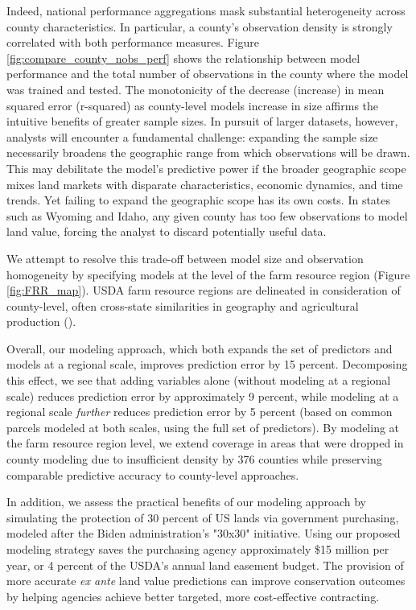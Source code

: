 \documentclass[12pt]{article}
\begin{document}
Indeed, national performance aggregations mask substantial heterogeneity across county characteristics. In particular, a county's observation density is strongly correlated with both performance measures. Figure \ref{fig:compare_county_nobs_perf} shows the relationship between model performance and the total number of observations in the county where the model was trained and tested. The monotonicity of the decrease (increase) in mean squared error (r-squared) as county-level models increase in size affirms the intuitive benefits of greater sample sizes. In pursuit of larger datasets, however, analysts will encounter a fundamental challenge: expanding the sample size necessarily broadens the geographic range from which observations will be drawn. This may debilitate the model's predictive power if the broader geographic scope mixes land markets with disparate characteristics, economic dynamics, and time trends. Yet failing to expand the geographic scope has its own costs. In states such as Wyoming and Idaho, any given county has too few observations to model land value, forcing the analyst to discard potentially useful data.

We attempt to resolve this trade-off between model size and observation homogeneity by specifying models at the level of the farm resource region (Figure \ref{fig:FRR_map}). USDA farm resource regions are delineated in consideration of county-level, often cross-state similarities in geography and agricultural production (\cite{FRR2000}).

Overall, our modeling approach, which both expands the set of predictors and models at a regional scale, improves prediction error by 15 percent. Decomposing this effect, we see that adding variables alone (without modeling at a regional scale) reduces prediction error by approximately 9 percent, while modeling at a regional scale \textit{further} reduces prediction error by 5 percent (based on common parcels modeled at both scales, using the full set of predictors). By modeling at the farm resource region level, we extend coverage in areas that were dropped in county modeling due to insufficient density by 376 counties while preserving comparable predictive accuracy to county-level approaches. 

In addition, we assess the practical benefits of our modeling approach by simulating the protection of 30 percent of US lands via government purchasing, modeled after the Biden administration's "30x30" initiative. Using our proposed modeling strategy saves the purchasing agency approximately \$15 million per year, or 4 percent of the USDA's annual land easement budget. The provision of more accurate \textit{ex ante} land value predictions can improve conservation outcomes by helping agencies achieve better targeted, more cost-effective contracting.
\end{document}
